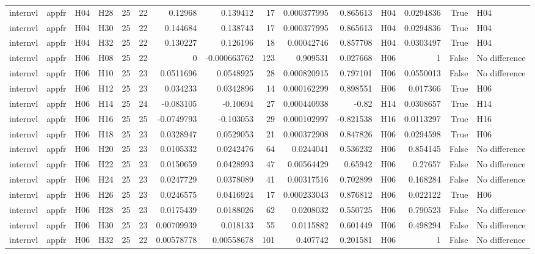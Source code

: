 \begin{longtable}{llllrrrrrrrlrrl}
internvl & appfr & H04 & H28 & 25 & 22 & 0.12968 & 0.139412 & 17 & 0.000377995 & 0.865613 & H04 & 0.0294836 & True & H04 \\
internvl & appfr & H04 & H30 & 25 & 22 & 0.144684 & 0.138743 & 17 & 0.000377995 & 0.865613 & H04 & 0.0294836 & True & H04 \\
internvl & appfr & H04 & H32 & 25 & 22 & 0.130227 & 0.126196 & 18 & 0.00042746 & 0.857708 & H04 & 0.0303497 & True & H04 \\
internvl & appfr & H06 & H08 & 25 & 22 & 0 & -0.000663762 & 123 & 0.909531 & 0.027668 & H06 & 1 & False & No difference \\
internvl & appfr & H06 & H10 & 25 & 23 & 0.0511696 & 0.0548925 & 28 & 0.000820915 & 0.797101 & H06 & 0.0550013 & False & No difference \\
internvl & appfr & H06 & H12 & 25 & 23 & 0.034233 & 0.0342896 & 14 & 0.000162299 & 0.898551 & H06 & 0.017366 & True & H06 \\
internvl & appfr & H06 & H14 & 25 & 24 & -0.083105 & -0.10694 & 27 & 0.000440938 & -0.82 & H14 & 0.0308657 & True & H14 \\
internvl & appfr & H06 & H16 & 25 & 25 & -0.0749793 & -0.103053 & 29 & 0.000102997 & -0.821538 & H16 & 0.0113297 & True & H16 \\
internvl & appfr & H06 & H18 & 25 & 23 & 0.0328947 & 0.0529053 & 21 & 0.000372908 & 0.847826 & H06 & 0.0294598 & True & H06 \\
internvl & appfr & H06 & H20 & 25 & 23 & 0.0105332 & 0.0242476 & 64 & 0.0244041 & 0.536232 & H06 & 0.854145 & False & No difference \\
internvl & appfr & H06 & H22 & 25 & 23 & 0.0150659 & 0.0428993 & 47 & 0.00564429 & 0.65942 & H06 & 0.27657 & False & No difference \\
internvl & appfr & H06 & H24 & 25 & 23 & 0.0247729 & 0.0378089 & 41 & 0.00317516 & 0.702899 & H06 & 0.168284 & False & No difference \\
internvl & appfr & H06 & H26 & 25 & 23 & 0.0246575 & 0.0416924 & 17 & 0.000233043 & 0.876812 & H06 & 0.022122 & True & H06 \\
internvl & appfr & H06 & H28 & 25 & 23 & 0.0175439 & 0.0188026 & 62 & 0.0208032 & 0.550725 & H06 & 0.790523 & False & No difference \\
internvl & appfr & H06 & H30 & 25 & 23 & 0.00709939 & 0.018133 & 55 & 0.0115882 & 0.601449 & H06 & 0.498294 & False & No difference \\
internvl & appfr & H06 & H32 & 25 & 22 & 0.00578778 & 0.00558678 & 101 & 0.407742 & 0.201581 & H06 & 1 & False & No difference \\

\end{longtable}

